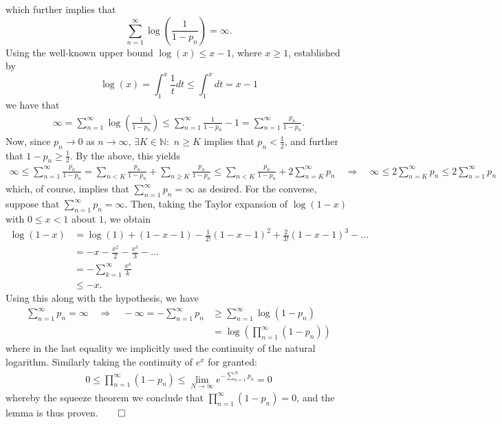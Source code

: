 \documentclass[10pt]{article}
\newcommand{\bp}[1]{\left({#1}\right)}
\newcommand{\mbb}[1]{\mathbb{#1}}
\newcommand{\1}[1]{\mathbbm{1}_{#1}}
\begin{document}
    which further implies that 
    \[\sum_{n=1}^\infty\log\bp{\frac{1}{1-p_n}}=\infty.\]
    Using the well-known upper bound $\log(x)\leq x-1$, where $x\geq 1$, established by
    \[\log(x)=\int_1^x\frac{1}{t}dt\leq \int_1^xdt=x-1\]
    we have that
    \begin{align*}
        \infty=\sum_{n=1}^\infty\log\bp{\frac{1}{1-p_n}}\leq\sum_{n=1}^\infty\frac{1}{1-p_n}-1=\sum_{n=1}^\infty\frac{p_n}{1-p_n}.
    \end{align*}
    Now, since $p_n\rightarrow 0$ as $n\rightarrow\infty$, $\exists K\in\mbb{N}:$ $n\geq K$ implies that $p_n<\tfrac{1}{2}$, and further that $1-p_n\geq \tfrac{1}{2}$. By the above, this yields
    \begin{align*}
        \infty\leq\sum_{n=1}^\infty\frac{p_n}{1-p_n}=\sum_{n<K}\frac{p_n}{1-p_n}+\sum_{n\geq K}\frac{p_n}{1-p_n}\leq \sum_{n<K}\frac{p_n}{1-p_n}+2\sum_{n=K}^\infty p_n\quad\Rightarrow\quad \infty \leq 2\sum_{n=K}^\infty p_n \leq 2\sum_{n=1}^\infty p_n
    \end{align*}
    which, of course, implies that $\sum_{n=1}^\infty p_n=\infty$ as desired. For the converse, suppose that $\sum_{n=1}^\infty p_n=\infty$. Then, taking the Taylor expansion of $\log(1-x)$ with $0\leq x<1$ about $1$, we obtain
    \begin{align*}
        \log(1-x)&=\log(1)+(1-x-1)-\frac{1}{2!}(1-x-1)^2+\frac{2}{3!}(1-x-1)^3-\dots\\
        &=-x-\frac{x^2}{2}-\frac{x^3}{3}-\dots\\
        &=-\sum_{k=1}^\infty\frac{x^k}{k}\\
        &\leq -x.\tag{1}
    \end{align*}
    Using this along with the hypothesis, we have
    \begin{align*}
        \sum_{n=1}^\infty p_n=\infty\quad\Rightarrow\quad -\infty=-\sum_{n=1}^\infty p_n&\geq \sum_{n=1}^\infty\log(1-p_n)\tag{by (1)}\\
        &=\log\bp{\prod_{n=1}^\infty(1-p_n)}
    \end{align*}
    where in the last equality we implicitly used the continuity of the natural logarithm. Similarly taking the continuity of $e^x$ for granted:
    \begin{align*}
        0\leq \prod_{n=1}^\infty(1-p_n)\leq \lim_{N\rightarrow\infty}e^{-\sum_{n=1}^Np_n}=0
    \end{align*}
    whereby the squeeze theorem we conclude that $\prod_{n=1}^\infty(1-p_n)=0$, and the lemma is thus proven.\hfill{$\qed$}\\[5pt]
\end{document}
